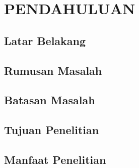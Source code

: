 \chapter{PENDAHULUAN}

\section{Latar Belakang}

\section{Rumusan Masalah}

\section{Batasan Masalah}

\section{Tujuan Penelitian}

\section{Manfaat Penelitian}
